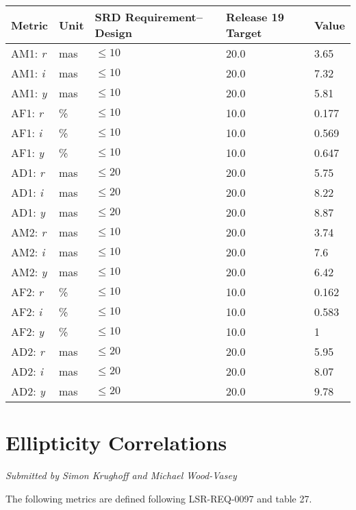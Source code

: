 \documentclass[DM,lsstdraft,toc]{lsstdoc}
\begin{document}
\begin{longtable}{L{0.19\columnwidth}L{0.08\columnwidth}L{0.2\columnwidth}R{0.22\columnwidth}R{0.17\columnwidth}}
\toprule
Metric &
Unit &
SRD Requirement--Design &
Release 19 Target &
Value
\tabularnewline
\midrule
\endhead
AM1: \emph{r} &
mas &
\(\leq 10\) &
20.0 &
3.65
\tabularnewline
AM1: \emph{i} &
mas &
\(\leq 10\) &
20.0 &
7.32
\tabularnewline
AM1: \emph{y} &
mas &
\(\leq 10\) &
20.0 &
5.81
\tabularnewline
AF1: \emph{r} &
\% &
\(\leq 10\) &
10.0 &
0.177
\tabularnewline
AF1: \emph{i} &
\% &
\(\leq 10\) &
10.0 &
0.569
\tabularnewline
AF1: \emph{y} &
\% &
\(\leq 10\) &
10.0 &
0.647
\tabularnewline
AD1: \emph{r} &
mas &
\(\leq 20\) &
20.0 &
5.75
\tabularnewline
AD1: \emph{i} &
mas &
\(\leq 20\) &
20.0 &
8.22
\tabularnewline
AD1: \emph{y} &
mas &
\(\leq 20\) &
20.0 &
8.87
\tabularnewline
AM2: \emph{r} &
mas &
\(\leq 10\) &
20.0 &
3.74
\tabularnewline
AM2: \emph{i} &
mas &
\(\leq 10\) &
20.0 &
7.6
\tabularnewline
AM2: \emph{y} &
mas &
\(\leq 10\) &
20.0 &
6.42
\tabularnewline
AF2: \emph{r} &
\% &
\(\leq 10\) &
10.0 &
0.162
\tabularnewline
AF2: \emph{i} &
\% &
\(\leq 10\) &
10.0 &
0.583
\tabularnewline
AF2: \emph{y} &
\% &
\(\leq 10\) &
10.0 &
1
\tabularnewline
AD2: \emph{r} &
mas &
\(\leq 20\) &
20.0 &
5.95
\tabularnewline
AD2: \emph{i} &
mas &
\(\leq 20\) &
20.0 &
8.07
\tabularnewline
AD2: \emph{y} &
mas &
\(\leq 20\) &
20.0 &
9.78
\tabularnewline
\bottomrule
\end{longtable}

\section{Ellipticity Correlations}\label{ellipticity-correlations}

\emph{Submitted by Simon Krughoff and Michael Wood-Vasey}

The following metrics are defined following LSR-REQ-0097
 and  table 27.
\end{document}

